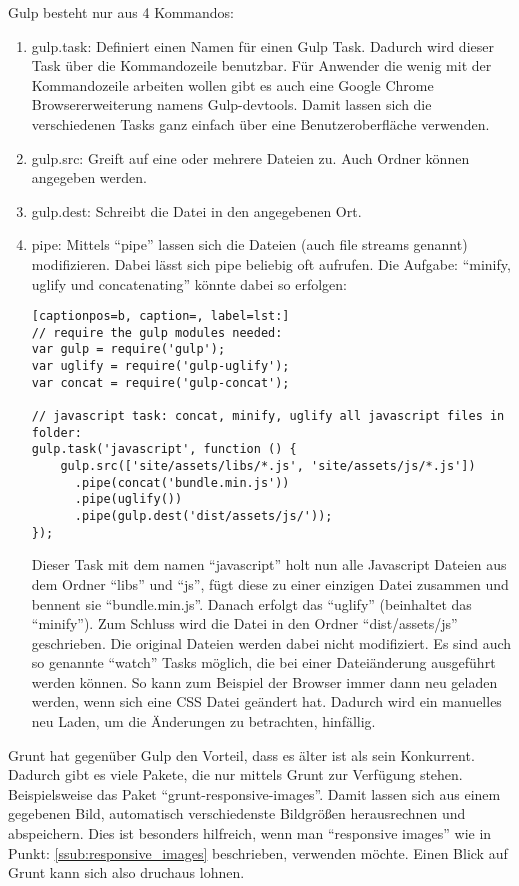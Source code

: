 		Gulp besteht nur aus 4 Kommandos:
		\begin{enumerate}
			\item gulp.task: Definiert einen Namen für einen Gulp Task. Dadurch wird dieser Task über die Kommandozeile benutzbar. Für Anwender die wenig mit der Kommandozeile arbeiten wollen gibt es auch eine Google Chrome Browsererweiterung namens Gulp-devtools. Damit lassen sich die verschiedenen Tasks ganz einfach über eine Benutzeroberfläche verwenden.
			\item gulp.src: Greift auf eine oder mehrere Dateien zu. Auch Ordner können angegeben werden.
			\item gulp.dest: Schreibt die Datei in den angegebenen Ort.
			\item pipe: Mittels "`pipe"' lassen sich die Dateien (auch file streams genannt) modifizieren. Dabei lässt sich pipe beliebig oft aufrufen. Die Aufgabe: "`minify, uglify und concatenating"' könnte dabei so erfolgen:
			\begin{lstlisting}[captionpos=b, caption=, label=lst:]
// require the gulp modules needed:
var gulp = require('gulp');
var uglify = require('gulp-uglify');
var concat = require('gulp-concat');

// javascript task: concat, minify, uglify all javascript files in folder:
gulp.task('javascript', function () {
    gulp.src(['site/assets/libs/*.js', 'site/assets/js/*.js'])
      .pipe(concat('bundle.min.js')) 
      .pipe(uglify())
      .pipe(gulp.dest('dist/assets/js/'));
});
			\end{lstlisting}
			Dieser Task mit dem namen "`javascript"' holt nun alle Javascript Dateien aus dem Ordner "`libs"' und "`js"', fügt diese zu einer einzigen Datei zusammen und bennent sie "`bundle.min.js"'. Danach erfolgt das "`uglify"' (beinhaltet das "`minify"'). Zum Schluss wird die Datei in den Ordner "`dist/assets/js"' geschrieben. Die original Dateien werden dabei nicht modifiziert. Es sind auch so genannte "`watch"' Tasks möglich, die bei einer Dateiänderung ausgeführt werden können. So kann zum Beispiel der Browser immer dann neu geladen werden, wenn sich eine CSS Datei geändert hat. Dadurch wird ein manuelles neu Laden, um die Änderungen zu betrachten, hinfällig.
				
		\end{enumerate}

		Grunt hat gegenüber Gulp den Vorteil, dass es älter ist als sein Konkurrent. Dadurch gibt es viele Pakete, die nur mittels Grunt zur Verfügung stehen. Beispielsweise das Paket "`grunt-responsive-images"'. Damit lassen sich aus einem gegebenen Bild, automatisch verschiedenste Bildgrößen herausrechnen und abspeichern. Dies ist besonders hilfreich, wenn man "`responsive images"' wie in Punkt: \ref{ssub:responsive_images} beschrieben, verwenden möchte. Einen Blick auf Grunt kann sich also druchaus lohnen.
		
